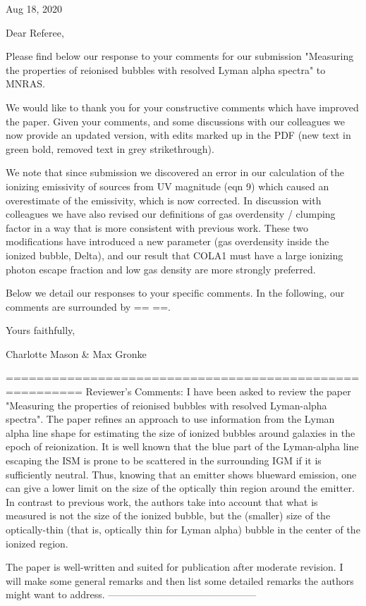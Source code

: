 Aug 18, 2020
 
 
Dear Referee,
 
Please find below our response to your comments for our submission "Measuring the properties of reionised bubbles with resolved Lyman alpha spectra" to MNRAS. 

We would like to thank you for your constructive comments which have improved the paper. Given your comments, and some discussions with our colleagues we now provide an updated version, with edits marked up in the PDF (new text in green bold, removed text in grey strikethrough).

We note that since submission we discovered an error in our calculation of the ionizing emissivity of sources from UV magnitude (eqn 9) which caused an overestimate of the emissivity, which is now corrected. In discussion with colleagues we have also revised our definitions of gas overdensity / clumping factor in a way that is more consistent with previous work. These two modifications have introduced a new parameter (gas overdensity inside the ionized bubble, Delta), and our result that COLA1 must have a large ionizing photon escape fraction and low gas density are more strongly preferred.

Below we detail our responses to your specific comments. In the following, our comments are surrounded by == ==.

Yours faithfully,


Charlotte Mason & Max Gronke

========================================================
Reviewer's Comments:
I have been asked to review the paper "Measuring the properties of reionised bubbles with resolved Lyman-alpha spectra". The paper refines an approach to use information from the Lyman alpha line shape for estimating the size of ionized bubbles around galaxies in the epoch of reionization. It is well known that the blue part of the Lyman-alpha line escaping the ISM is prone to be scattered in the surrounding IGM if it is sufficiently neutral. Thus, knowing that an emitter shows blueward emission, one can give a lower limit on the size of the optically thin region around the emitter. In contrast to previous work, the authors take into account that what is measured is not the size of the ionized bubble, but the (smaller) size of the optically-thin (that is, optically thin for Lyman alpha) bubble in the center of the ionized region.

The paper is well-written and suited for publication after moderate revision. I will make some general remarks and then list some detailed remarks the authors might want to address.
---------------------------------------------

